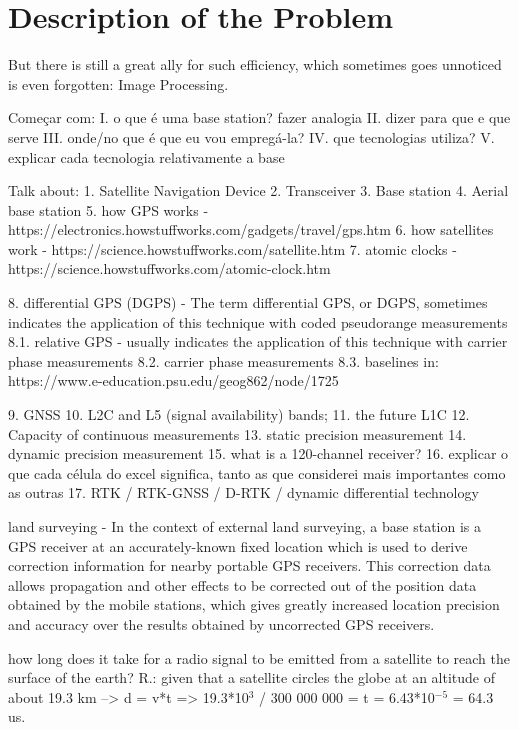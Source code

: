 \section{Description of the Problem}\label{I_description}

But there is still a great ally for such efficiency, which sometimes goes unnoticed is even forgotten: Image Processing.


Começar com:
I. o que é uma base station? fazer analogia
II. dizer para que e que serve
III. onde/no que é que eu vou empregá-la?
IV. que tecnologias utiliza?
V. explicar cada tecnologia relativamente a base


Talk about:
    1. Satellite Navigation Device
    2. Transceiver
    3. Base station
    4. Aerial base station
    5. how GPS works - https://electronics.howstuffworks.com/gadgets/travel/gps.htm
    6. how satellites work - https://science.howstuffworks.com/satellite.htm
    7. atomic clocks - https://science.howstuffworks.com/atomic-clock.htm

    8. differential GPS (DGPS) - The term differential GPS, or DGPS, sometimes indicates the application of this technique with coded pseudorange measurements
    8.1. relative GPS - usually indicates the application of this technique with carrier phase measurements
    8.2. carrier phase measurements
    8.3. baselines
    in: https://www.e-education.psu.edu/geog862/node/1725

    9. GNSS
    10. L2C and L5 (signal availability) bands;
    11. the future L1C
    12. Capacity of continuous measurements
    13. static precision measurement
    14. dynamic precision measurement
    15. what is a 120-channel receiver?
    16. explicar o que cada célula do excel significa, tanto as que considerei mais importantes como as outras
    17. RTK / RTK-GNSS / D-RTK / dynamic differential technology
        

    land surveying - In the context of external land surveying, a base station is a GPS receiver at an accurately-known fixed location which is used to derive correction information for nearby portable GPS receivers. This correction data allows propagation and other effects to be corrected out of the position data obtained by the mobile stations, which gives greatly increased location precision and accuracy over the results obtained by uncorrected GPS receivers.

    how long does it take for a radio signal to be emitted from a satellite to reach the surface of the earth? 
    R.: given that a satellite circles the globe at an altitude of about 19.3 km --> d = v*t => 19.3*10$^3$ / 300 000 000 = t = 6.43*10$^{-5}$ = 64.3 us.

